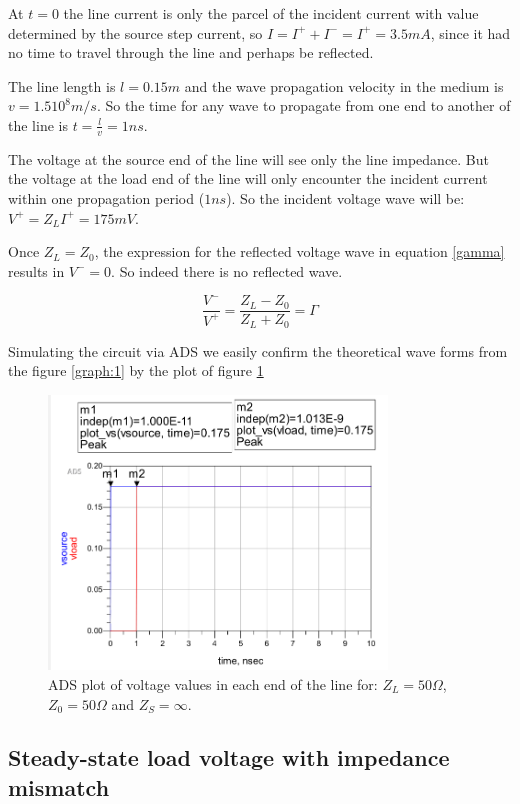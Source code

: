 At $t=0$ the line current is only the parcel of the incident current with value determined by the source step current, so $I = I^+ + I^- = I^+ = 3.5 mA$, since it had no time to travel through the line and perhaps be reflected.

The line length is $l = 0.15m$ and the wave propagation velocity in the medium is $v = 1.5 10^{8} m/s$. So the time for any wave to propagate from one end to another of the line is $t = \frac{l}{v} = 1 ns$.

The voltage at the source end of the line will see only the line impedance. But the voltage at the load end of the line will only encounter the incident current within one propagation period ($1ns$). So the incident voltage wave will be: $V^+ = Z_L I^+ = 175 mV$.



Once $Z_L = Z_0$, the expression for the reflected voltage wave in equation \ref{gamma} results in $V^-= 0$. So indeed there is no reflected wave.

\begin{equation} \label{gamma}
    \frac{V^-}{V^+} = \frac{Z_L - Z_0}{Z_L + Z_0} = \Gamma
\end{equation}

Simulating the circuit via ADS we easily confirm the theoretical wave forms from the figure \ref{graph:1} by the plot of figure \ref{ads:plot:voltages50}

\begin{figure}[H] 
\centering
\includegraphics[width=9cm]{images/lab1_p1_plot1.png}
\caption{ADS plot of voltage values in each end of the line for: $Z_L = 50 \Omega$, $Z_0 = 50 \Omega$ and $Z_S = \infty$.}
\label{ads:plot:voltages50} 
\end{figure}

\subsection{Steady-state load voltage with impedance mismatch}

